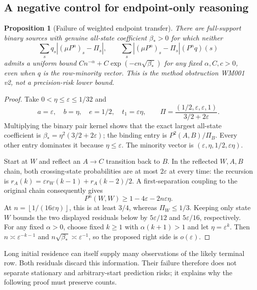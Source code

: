 \documentclass[11pt,letterpaper]{article}
\newtheorem{proposition}[theorem]{Proposition}
\theoremstyle{definition}\newtheorem{definition}[theorem]{Definition}
\theoremstyle{remark}\newtheorem{remark}[theorem]{Remark}
\newcommand{\floor}[1]{\left\lfloor #1\right\rfloor}
\newcommand{\unit}[1]{\textsf{#1}}
\begin{document}
\subsection{A negative control for endpoint-only reasoning}
\begin{proposition}[Failure of weighted endpoint transfer]\label{prop:mixingfailure}
There are full-support binary sources with genuine all-state coefficient $\beta_*>0$ for which neither
\[
 \sum_s q_s|(\mu P^n)_s-\Pi_s|,
 \qquad
 \sum_s|(\mu P^n)_s-\Pi_s|(P^nq)(s)
\]
admits a uniform bound
$C n^{-\alpha}+C\exp(-cn\sqrt{\beta_*})$
for any fixed $\alpha,C,c>0$, even when $q$ is the row-minority vector. This is the method obstruction \unit{WM001 v2}, not a precision-risk lower bound.
\end{proposition}
\begin{proof}
Take $0<\eta\le\varepsilon\le1/32$ and
\[
 a=\varepsilon,\quad b=\eta,\quad e=1/2,\quad t_1=\varepsilon\eta,
 \qquad
 \Pi=\frac{(1/2,\varepsilon,\varepsilon,1)}{3/2+2\varepsilon}.
\]
Multiplying the binary pair kernel shows that the exact largest all-state coefficient is
$\beta_*=\eta^2(3/2+2\varepsilon)$; the binding entry is $P^2(A,B)/\Pi_B$. Every other entry dominates it because $\eta\le\varepsilon$. The minority vector is $(\varepsilon,\eta,1/2,\varepsilon\eta)$.

Start at $W$ and reflect an $A\to C$ transition back to $B$. In the reflected $W,A,B$ chain, both crossing-state probabilities are at most $2\varepsilon$ at every time: the recursion is
$r_A(k)=\varepsilon r_W(k-1)+r_A(k-2)/2$.
A first-separation coupling to the original chain consequently gives
\[
 P^n(W,W)\ge1-4\varepsilon-2n\varepsilon\eta .
\]
At $n=\floor{1/(16\varepsilon\eta)}$, this is at least $3/4$, whereas $\Pi_W\le1/3$. Keeping only state $W$ bounds the two displayed residuals below by $5\varepsilon/12$ and $5\varepsilon/16$, respectively. For any fixed $\alpha>0$, choose fixed $k\ge1$ with $\alpha(k+1)>1$ and let $\eta=\varepsilon^k$. Then
$n\asymp\varepsilon^{-k-1}$ and $n\sqrt{\beta_*}\asymp\varepsilon^{-1}$, so the proposed right side is $o(\varepsilon)$.
\end{proof}

Long initial residence can itself supply many observations of the likely terminal row. Both residuals discard this information. Their failure therefore does not separate stationary and arbitrary-start prediction risks; it explains why the following proof must preserve counts.
\end{document}
